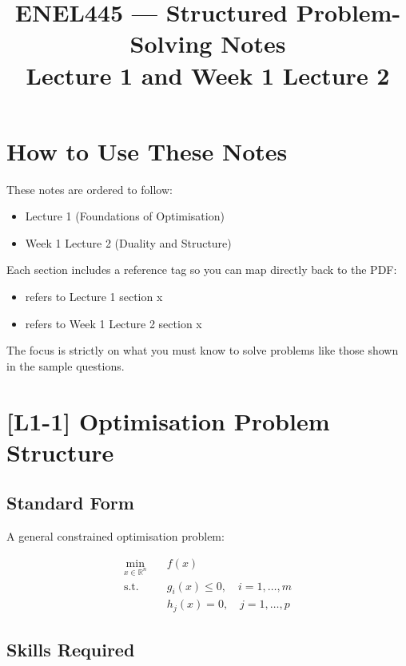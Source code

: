 \documentclass[11pt]{article}
\title{ENEL445 --- Structured Problem-Solving Notes \\ Lecture 1 and Week 1 Lecture 2}
\author{}
\date{}
\begin{document}
\maketitle

\section*{How to Use These Notes}

These notes are ordered to follow:

\begin{itemize}
\item Lecture 1 (Foundations of Optimisation)
\item Week 1 Lecture 2 (Duality and Structure)
\end{itemize}

Each section includes a reference tag so you can map directly back to the PDF:

\begin{itemize}
\item [L1-x] refers to Lecture 1 section x
\item [W1L2-x] refers to Week 1 Lecture 2 section x
\end{itemize}

The focus is strictly on what you must know to solve problems like those shown in the sample questions.

\newpage

\section*{[L1-1] Optimisation Problem Structure}

\subsection*{Standard Form}

A general constrained optimisation problem:

\begin{align*}
\min_{x \in \mathbb{R}^n} \quad & f(x) \\
\text{s.t.} \quad & g_i(x) \le 0, \quad i=1,\dots,m \\
& h_j(x) = 0, \quad j=1,\dots,p
\end{align*}

\subsection*{Skills Required}
\end{document}
